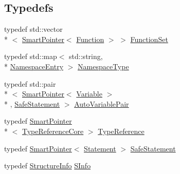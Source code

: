 \subsection*{Typedefs}
\begin{DoxyCompactItemize}
\item 
typedef std\-::vector\\*
$<$ \hyperlink{_smart_pointer_8hpp_afdd8d4ba81c3fcbdeacf1dafba2accfb}{Smart\-Pointer}$<$ \hyperlink{class_a_p_i_1_1_function}{Function} $>$ $>$ \hyperlink{namespace_scribble_core_a9e40b3081eb67f0c92c1d1d5041495cf}{Function\-Set}
\item 
typedef std\-::map$<$ std\-::string, \\*
\hyperlink{class_scribble_core_1_1_namespace_entry}{Namespace\-Entry} $>$ \hyperlink{namespace_scribble_core_acf9f6e70f7e422fafa73920c31cff3cb}{Namespace\-Type}
\item 
typedef std\-::pair\\*
$<$ \hyperlink{_smart_pointer_8hpp_afdd8d4ba81c3fcbdeacf1dafba2accfb}{Smart\-Pointer}$<$ \hyperlink{class_scribble_core_1_1_variable}{Variable} $>$\\*
, \hyperlink{namespace_scribble_core_a2ad5bf236bc9164cb56f564685f15a11}{Safe\-Statement} $>$ \hyperlink{namespace_scribble_core_a6c19e97eb8a6427c1f921de9e13fd534}{Auto\-Variable\-Pair}
\item 
typedef \hyperlink{_smart_pointer_8hpp_afdd8d4ba81c3fcbdeacf1dafba2accfb}{Smart\-Pointer}\\*
$<$ \hyperlink{struct_scribble_core_1_1_type_reference_core}{Type\-Reference\-Core} $>$ \hyperlink{namespace_scribble_core_a0e685a305b14aa5f0504df1369ba270b}{Type\-Reference}
\item 
typedef \hyperlink{_smart_pointer_8hpp_afdd8d4ba81c3fcbdeacf1dafba2accfb}{Smart\-Pointer}$<$ \hyperlink{class_scribble_core_1_1_statement}{Statement} $>$ \hyperlink{namespace_scribble_core_a2ad5bf236bc9164cb56f564685f15a11}{Safe\-Statement}
\item 
typedef \hyperlink{class_scribble_core_1_1_structure_info}{Structure\-Info} \hyperlink{namespace_scribble_core_a3a14a97bb67cd5efa082d8dda7595cca}{S\-Info}
\end{DoxyCompactItemize}
